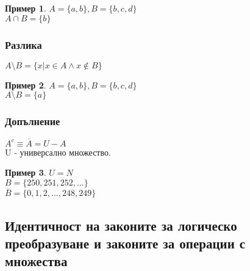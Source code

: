 \documentclass[fleqn, 12pt]{article}
\theoremstyle{definition}
\newtheorem{example}{Пример}[subsection]
\begin{document}
\begin{example}
$A = \{a, b\}, B = \{b, c, d\}$\\
$A \cap B = \{b\}$
\end{example}

\subsubsection{Разлика}

$A \setminus B = \{x | x \in A \land x \notin B \}$
\begin{example}
$A = \{a, b\}, B = \{b, c, d\}$\\
$A \setminus B = \{a\}$
\end{example}

\subsubsection{Допълнение}
$A^c \equiv  \overline{A} = U - A$\\ 
U - универсално множество. 

\begin{example}
$U = N$\\
$B = \{250, 251, 252, ...\}$\\
$\overline{B} = \{0, 1, 2, ..., 248, 249\}$
\end{example}

\subsection{Идентичност на законите за логическо преобразуване и законите за операции с множества}
\end{document}
